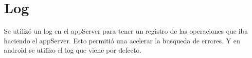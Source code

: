 \documentclass[letterpaper,10pt,spanish]{sphinxmanual}
\begin{document}
\section{Log}
\label{manual:log}
Se utilizó un log en el appServer para tener un registro de las operaciones que iba haciendo el appServer. Esto permitió una acelerar la busqueda de errores.
Y en android se utilizo el log que viene por defecto.



\renewcommand{\indexname}{Índice}
\printindex
\end{document}
